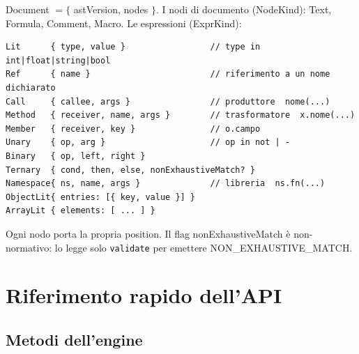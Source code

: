 \documentclass[11pt,a4paper]{book}
\let\code\lstinline
\newcommand{\ic}[1]{{\ttfamily #1}}
\theoremstyle{definition}
\begin{document}
{{{{\ic{Document} $= \{$ \ic{astVersion}, \ic{nodes} $\}$. I nodi di documento
(\ic{NodeKind}): \ic{Text}, \ic{Formula}, \ic{Comment}, \ic{Macro}. Le espressioni
(\ic{ExprKind}):

\begin{lstlisting}
Lit      { type, value }                 // type in int|float|string|bool
Ref      { name }                        // riferimento a un nome dichiarato
Call     { callee, args }                // produttore  nome(...)
Method   { receiver, name, args }        // trasformatore  x.nome(...)
Member   { receiver, key }               // o.campo
Unary    { op, arg }                     // op in not | -
Binary   { op, left, right }
Ternary  { cond, then, else, nonExhaustiveMatch? }
Namespace{ ns, name, args }              // libreria  ns.fn(...)
ObjectLit{ entries: [{ key, value }] }
ArrayLit { elements: [ ... ] }
\end{lstlisting}

Ogni nodo porta la propria \ic{position}. Il flag \ic{nonExhaustiveMatch} è
non-normativo: lo legge solo \code|validate| per emettere \ic{NON\_EXHAUSTIVE\_MATCH}.

\chapter{Riferimento rapido dell'API}
\label{app:api}

\section{Metodi dell'engine}

}}}}
\end{document}
